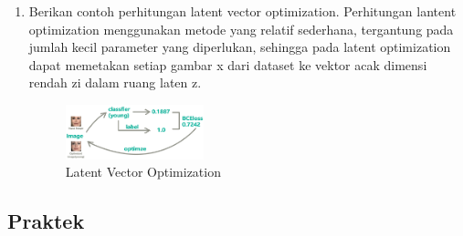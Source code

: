 \begin{enumerate}
        \item Berikan contoh perhitungan latent vector optimization.
		Perhitungan lantent optimization menggunakan metode yang relatif sederhana, tergantung pada jumlah kecil parameter yang diperlukan, sehingga pada latent optimization dapat memetakan setiap gambar x dari dataset ke vektor acak dimensi rendah zi dalam ruang laten z.
		\begin{figure}[H]
			\includegraphics[width=4cm]{figures/1174012/chapter9/teori11.png}
            	\centering
           	\caption{Latent Vector Optimization}
        \end{figure}
           
\end{enumerate}

\subsection{Praktek}

